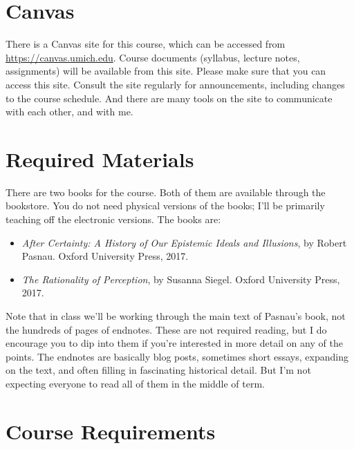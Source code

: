 \documentclass[
]{article}
\providecommand{\tightlist}{%
  \setlength{\itemsep}{0pt}\setlength{\parskip}{0pt}}\usepackage{longtable,booktabs,array}
\begin{document}
\hypertarget{canvas}{%
\section{Canvas}\label{canvas}}

There is a Canvas site for this course, which can be accessed from
\url{https://canvas.umich.edu}. Course documents (syllabus, lecture
notes, assignments) will be available from this site. Please make sure
that you can access this site. Consult the site regularly for
announcements, including changes to the course schedule. And there are
many tools on the site to communicate with each other, and with me.

\newpage

\hypertarget{required-materials}{%
\section{Required Materials}\label{required-materials}}

There are two books for the course. Both of them are available through
the bookstore. You do not need physical versions of the books; I'll be
primarily teaching off the electronic versions. The books are:

\begin{itemize}
\tightlist
\item
  \emph{After Certainty: A History of Our Epistemic Ideals and
  Illusions}, by Robert Pasnau. Oxford University Press, 2017.
\item
  \emph{The Rationality of Perception}, by Susanna Siegel. Oxford
  University Press, 2017.
\end{itemize}

Note that in class we'll be working through the main text of Pasnau's
book, not the hundreds of pages of endnotes. These are not required
reading, but I do encourage you to dip into them if you're interested in
more detail on any of the points. The endnotes are basically blog posts,
sometimes short essays, expanding on the text, and often filling in
fascinating historical detail. But I'm not expecting everyone to read
all of them in the middle of term.

\hypertarget{course-requirements}{%
\section{Course Requirements}\label{course-requirements}}
\end{document}
